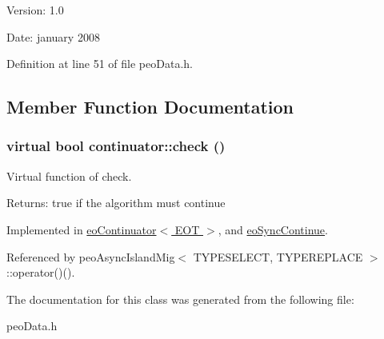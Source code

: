 \begin{Desc}
\item[Version:]1.0 \end{Desc}
\begin{Desc}
\item[Date:]january 2008 \end{Desc}




Definition at line 51 of file peo\-Data.h.

\subsection{Member Function Documentation}
\hypertarget{classcontinuator_30601b037ab27b40610af1b979ec3d5b}{
\subsubsection[check]{\setlength{\rightskip}{0pt plus 5cm}virtual bool continuator::check ()}}
\label{classcontinuator_30601b037ab27b40610af1b979ec3d5b}


Virtual function of check. 

\begin{Desc}
\item[Returns:]true if the algorithm must continue \end{Desc}


Implemented in \hyperlink{classeoContinuator_4e599bd4db85a57b44f9b94580eee178}{eo\-Continuator$<$ EOT $>$}, and \hyperlink{classeoSyncContinue_417078233f768debb14b5a90f6412b3c}{eo\-Sync\-Continue}.

Referenced by peo\-Async\-Island\-Mig$<$ TYPESELECT, TYPEREPLACE $>$::operator()().

The documentation for this class was generated from the following file:\begin{CompactItemize}
\item 
peo\-Data.h\end{CompactItemize}
